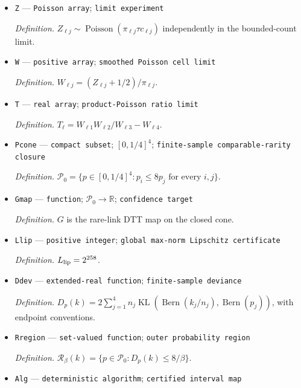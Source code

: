 \documentclass{article}
\begin{document}
\begin{itemize}
  \par\smallskip\noindent\emph{Definition.} \(b_n=\sqrt{n/\rho_n}\{L\sqrt{\overline V}\}^{-1}\sum_{\ell=1}^{L}(\Delta^P_{\ell n}-\Delta_{\ell n})\).
  \item \texttt{Z} --- \texttt{Poisson array}; \texttt{limit experiment}
  \par\smallskip\noindent\emph{Definition.} \(Z_{\ell j}\sim\operatorname{Poisson}(\pi_{\ell j}\tau c_{\ell j})\) independently in the bounded-count limit.
  \item \texttt{W} --- \texttt{positive array}; \texttt{smoothed Poisson cell limit}
  \par\smallskip\noindent\emph{Definition.} \(W_{\ell j}=(Z_{\ell j}+1/2)/\pi_{\ell j}\).
  \item \texttt{T} --- \texttt{real array}; \texttt{product-\allowbreak{}Poisson ratio limit}
  \par\smallskip\noindent\emph{Definition.} \(T_{\ell}=W_{\ell1}W_{\ell2}/W_{\ell3}-W_{\ell4}\).
  \item \texttt{Pcone} --- \texttt{compact subset}; \([0,1/4]^4\); \texttt{finite-\allowbreak{}sample comparable-\allowbreak{}rarity closure}
  \par\smallskip\noindent\emph{Definition.} \(\mathcal P_0=\{p\in[0,1/4]^4:p_i\le8p_j\text{ for every }i,j\}\).
  \item \texttt{Gmap} --- \texttt{function}; \(\mathcal P_0\to\mathbb R\); \texttt{confidence target}
  \par\smallskip\noindent\emph{Definition.} \(G\) is the rare-link DTT map on the closed cone.
  \item \texttt{Llip} --- \texttt{positive integer}; \texttt{global max-\allowbreak{}norm Lipschitz certificate}
  \par\smallskip\noindent\emph{Definition.} \(L_{\rm lip}=2^{258}\).
  \item \texttt{Ddev} --- \texttt{extended-\allowbreak{}real function}; \texttt{finite-\allowbreak{}sample deviance}
  \par\smallskip\noindent\emph{Definition.} \(D_p(k)=2\sum_{j=1}^{4}n_j\operatorname{KL}(\operatorname{Bern}(k_j/n_j),\operatorname{Bern}(p_j))\), with endpoint conventions.
  \item \texttt{Rregion} --- \texttt{set-\allowbreak{}valued function}; \texttt{outer probability region}
  \par\smallskip\noindent\emph{Definition.} \(\mathcal R_{\beta}(k)=\{p\in\mathcal P_0:D_p(k)\le8/\beta\}\).
  \item \texttt{Alg} --- \texttt{deterministic algorithm}; \texttt{certified interval map}

\end{itemize}
\end{document}

